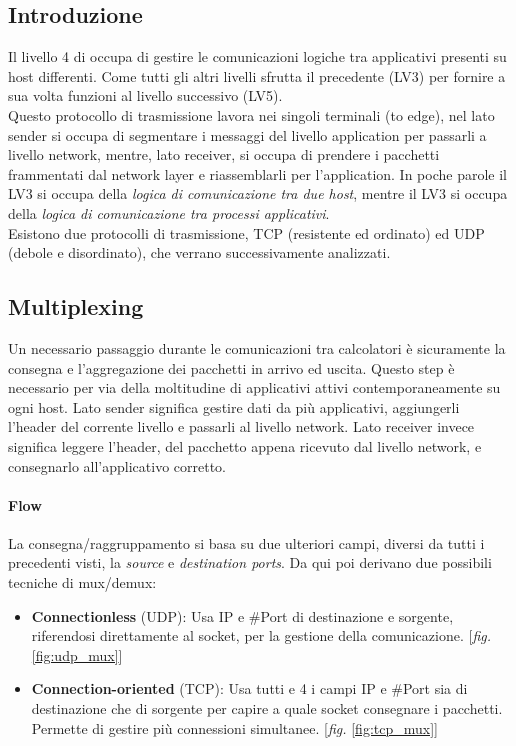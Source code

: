 \documentclass[12pt]{article}
\begin{document}
\subsection{Introduzione} %
Il livello 4 di occupa di gestire le comunicazioni logiche tra applicativi presenti su host differenti. Come tutti gli altri livelli sfrutta il precedente (LV3) per fornire a sua volta funzioni al livello successivo (LV5).\\
Questo protocollo di trasmissione lavora nei singoli terminali (to edge), nel lato sender si occupa di segmentare i messaggi del livello application per passarli a livello network, mentre, lato receiver, si occupa di prendere i pacchetti frammentati dal network layer e riassemblarli per l'application. In poche parole il LV3 si occupa della \textit{logica di comunicazione tra due host}, mentre il LV3 si occupa della \textit{logica di comunicazione tra processi applicativi}.\\
Esistono due protocolli di trasmissione, TCP (resistente ed ordinato) ed UDP (debole e disordinato), che verrano successivamente analizzati.

\subsection{Multiplexing} \label{subsec:mpx} %
Un necessario passaggio durante le comunicazioni tra calcolatori è sicuramente la consegna e l'aggregazione dei pacchetti in arrivo ed uscita. Questo step è necessario per via della moltitudine di applicativi attivi contemporaneamente su ogni host. Lato sender significa gestire dati da più applicativi, aggiungerli l'header del corrente livello e passarli al livello network. Lato receiver invece significa leggere l'header, del pacchetto appena ricevuto dal livello network, e consegnarlo all'applicativo corretto.

\paragraph{Flow} La consegna/raggruppamento si basa su due ulteriori campi, diversi da tutti i precedenti visti, la \textit{source} e \textit{destination ports}. Da qui poi derivano due possibili tecniche di mux/demux:
\begin{itemize}
  \item \textbf{Connectionless} (UDP): Usa IP e \#Port di destinazione e sorgente, riferendosi direttamente al socket, per la gestione della comunicazione. [\textit{fig. }\ref{fig:udp_mux}]
  \item \textbf{Connection-oriented} (TCP): Usa tutti e 4 i campi IP e \#Port sia di destinazione che di sorgente per capire a quale socket consegnare i pacchetti. Permette di gestire più connessioni simultanee. [\textit{fig. }\ref{fig:tcp_mux}]
\end{itemize}
\end{document}
